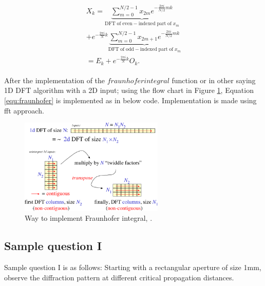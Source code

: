 \documentclass[journal,9pt]{IEEEtran}
\begin{document}
\lstset{language=Python,breaklines=true}


\begin{equation}
\label{equ:cooleytukey}
\begin{split}
\begin{matrix} X_k= \underbrace{\sum \limits_{m=0}^{N/2-1} x_{2m}   e^{-\frac{2\pi i}{N/2} mk}}_{\mathrm{DFT\;of\;even-indexed\;part\;of\;} x_m} {} \\
+  e^{-\frac{2\pi i}{N}k}
 \underbrace{\sum \limits_{m=0}^{N/2-1} x_{2m+1} e^{-\frac{2\pi i}{N/2} mk}}_{\mathrm{DFT\;of\;odd-indexed\;part\;of\;} x_m} \\
 =  E_k + e^{-\frac{2\pi i}{N}k} O_k.
\end{matrix}
\end{split}
\end{equation}

After the implementation of the $fraunhoferintegral$ function or in other saying 1D DFT algorithm with a 2D input; using the flow chart in Figure \ref{fig:cooleytukey}, Equation \ref{equ:fraunhofer} is implemented as in below code. Implementation is made using fft approach.

\lstset{language=Python,breaklines=true}


\begin{figure}[H]
\centering
\includegraphics[width=2.7in]{cooleytukey}
\caption{Way to implement Fraunhofer integral, \cite{cooleytukey}.}
\label{fig:cooleytukey}
\end{figure}

\subsection{Sample question I}
Sample question I is as follows: Starting with a rectangular aperture of size 1mm, observe the diffraction pattern at different critical propagation distances.
\end{document}
